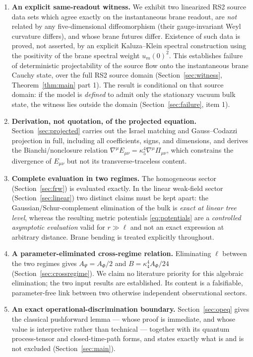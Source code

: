 \documentclass[11pt,a4paper]{article}
\theoremstyle{plain}
\theoremstyle{definition}
\newcommand{\kfive}{\kappa_5}
\newcommand{\kfour}{\kappa_4}
\begin{document}
\begin{enumerate}[leftmargin=*]
\item \textbf{An explicit same-readout witness.} We exhibit two
linearized RS2 source data sets which agree exactly on the instantaneous
brane readout, are \emph{not} related by any five-dimensional
diffeomorphism (their gauge-invariant Weyl curvature differs), and whose
brane futures differ. Existence of such data is proved, not asserted, by
an explicit Kaluza--Klein spectral construction using the positivity of
the brane spectral weight $u_m(0)^2$. This establishes failure of
deterministic projectability of the source flow onto the instantaneous
brane Cauchy state, over the full RS2 source domain
(Section~\ref{sec:witness}, Theorem~\ref{thm:main} part 1). The result is conditional on that source
domain: if the model is \emph{defined} to admit only the stationary
vacuum bulk state, the witness lies outside the domain
(Section~\ref{sec:failure}, item 1).

\item \textbf{Derivation, not quotation, of the projected equation.}
Section~\ref{sec:projected} carries out the Israel matching and
Gauss--Codazzi projection in full, including all coefficients, signs, and
dimensions, and derives the Bianchi/nonclosure relation
$\nabla^\mu E_{\mu\nu}=\kfive^4\nabla^\mu\Pi_{\mu\nu}$, which constrains
the divergence of $E_{\mu\nu}$ but not its transverse-traceless content.

\item \textbf{Complete evaluation in two regimes.} The homogeneous sector
(Section~\ref{sec:frw}) is evaluated exactly. In the linear weak-field
sector (Section~\ref{sec:linear}) two distinct claims must be kept apart:
the Gaussian/Schur-complement elimination of the bulk is \emph{exact at
linear tree level}, whereas the resulting metric potentials
\eqref{eq:potentials} are a \emph{controlled asymptotic evaluation} valid
for $r\gg\ell$ and not an exact expression at arbitrary distance. Brane
bending is treated explicitly throughout.

\item \textbf{A parameter-eliminated cross-regime relation.} Eliminating
$\ell$ between the two regimes gives
$A_\Psi=A_\Phi/2$ and $B=\kfour^4A_\Phi/24$
(Section~\ref{sec:crossregime}). We claim no literature priority for this
algebraic elimination; the two input results are established. Its content
is a falsifiable, parameter-free link between two otherwise independent
observational sectors.

\item \textbf{An exact operational-discrimination boundary.}
Section~\ref{sec:opeq} gives the classical pushforward lemma --- whose
proof is immediate, and whose value is interpretive rather than technical
--- together with its quantum process-tensor and closed-time-path forms,
and states exactly what is and is not excluded (Section~\ref{sec:main}).
\end{enumerate}
\end{document}
